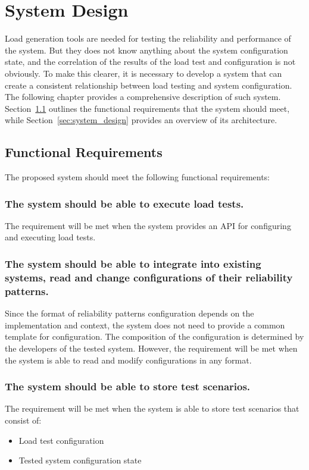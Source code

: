 \graphicspath{{figs/}} %


\chapter{System Design}
\label{ch:lr}

Load generation tools are needed for testing the reliability and performance of the system. But they does not know anything about the system configuration state, and the correlation of the results of the load test and configuration is not obviously. To make this clearer, it is necessary to develop a system that can create a consistent relationship between load testing and system configuration. The following chapter provides a comprehensive description of such system. Section~\ref{sec:functional-requirements} outlines the functional requirements that the system should meet, while Section~\ref{sec:system_design} provides an overview of its architecture.


\section{Functional Requirements}\label{sec:functional-requirements}
The proposed system should meet the following functional requirements:

\subsection{The system should be able to execute load tests.}\label{subsec:fr:execute_load_test}
The requirement will be met when the system provides an API for configuring and executing load tests.

\subsection{The system should be able to integrate into existing systems, read and change configurations of their reliability patterns.}\label{subsec:fr:integrate}
Since the format of reliability patterns configuration depends on the implementation and context, the system does not need to provide a common template for configuration. The composition of the configuration is determined by the developers of the tested system. However, the requirement will be met when the system is able to read and modify configurations in any format.

\subsection{The system should be able to store test scenarios.}\label{subsec:fr:store_scenarios}
The requirement will be met when the system is able to store test scenarios that consist of:
\begin{itemize}
    \item Load test configuration
    \item Tested system configuration state
\end{itemize}

